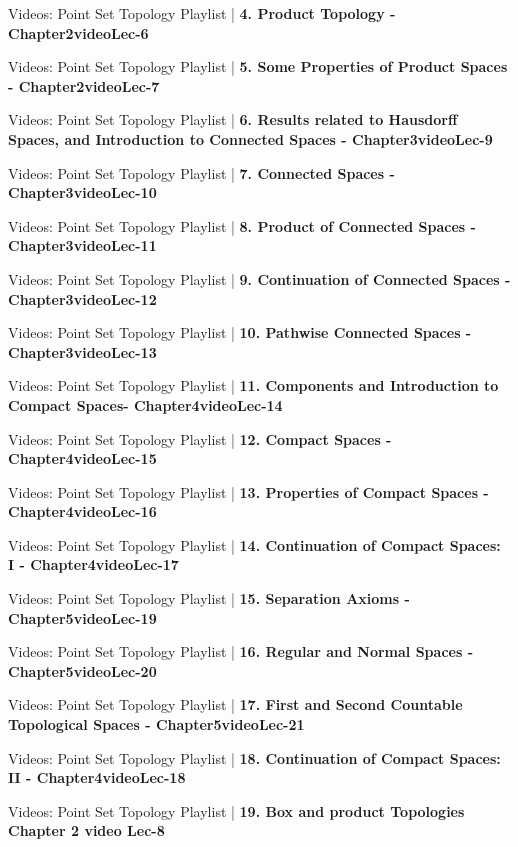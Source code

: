 \documentclass[a4, landscape, 12pt]{article}
\newcommand{\checkbox}{$\square$}%
\begin{document}
\begin{itemize}
{{}
\item [\checkbox] Videos: Point Set Topology Playlist  | \textbf{4. Product Topology - Chapter2videoLec-6
}
\item [\checkbox] Videos: Point Set Topology Playlist  | \textbf{5. Some Properties of Product Spaces - Chapter2videoLec-7
}
\item [\checkbox] Videos: Point Set Topology Playlist  | \textbf{6. Results related to Hausdorff Spaces, and Introduction to Connected Spaces - Chapter3videoLec-9
}
\item [\checkbox] Videos: Point Set Topology Playlist  | \textbf{7. Connected Spaces - Chapter3videoLec-10
}
\item [\checkbox] Videos: Point Set Topology Playlist  | \textbf{8. Product of Connected Spaces - Chapter3videoLec-11
}
\item [\checkbox] Videos: Point Set Topology Playlist  | \textbf{9. Continuation of Connected Spaces  - Chapter3videoLec-12
}
\item [\checkbox] Videos: Point Set Topology Playlist  | \textbf{10. Pathwise Connected Spaces - Chapter3videoLec-13
}
\item [\checkbox] Videos: Point Set Topology Playlist  | \textbf{11. Components and Introduction to Compact Spaces- Chapter4videoLec-14
}
\item [\checkbox] Videos: Point Set Topology Playlist  | \textbf{12. Compact Spaces - Chapter4videoLec-15
}
\item [\checkbox] Videos: Point Set Topology Playlist  | \textbf{13. Properties of Compact Spaces - Chapter4videoLec-16
}
\item [\checkbox] Videos: Point Set Topology Playlist  | \textbf{14. Continuation of Compact Spaces: I - Chapter4videoLec-17
}
\item [\checkbox] Videos: Point Set Topology Playlist  | \textbf{15. Separation Axioms - Chapter5videoLec-19
}
\item [\checkbox] Videos: Point Set Topology Playlist  | \textbf{16. Regular and Normal Spaces - Chapter5videoLec-20
}
\item [\checkbox] Videos: Point Set Topology Playlist  | \textbf{17. First and Second Countable Topological Spaces - Chapter5videoLec-21
}
\item [\checkbox] Videos: Point Set Topology Playlist  | \textbf{18. Continuation of Compact Spaces: II  - Chapter4videoLec-18
}
\item [\checkbox] Videos: Point Set Topology Playlist  | \textbf{19. Box and product Topologies  Chapter 2 video Lec-8
}}
\end{itemize}
\end{document}
